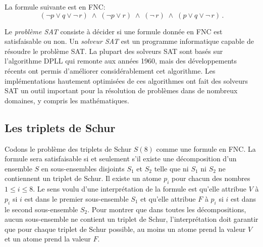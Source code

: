 La formule suivante est en FNC:
\[
(\neg p \vee q \vee \neg \,r) \;\wedge\; (\neg p \vee r)
\;\wedge\; (\neg \,r)\;\wedge\;(p \vee q \vee \neg \,r)\,.
\]

Le \emph{problème SAT} consiste à décider si une formule donnée en FNC est satisfaisable ou non. Un \emph{solveur SAT} est un programme informatique capable de résoudre le problème SAT. La plupart des solveurs SAT sont basés sur l'algorithme DPLL qui remonte aux années 1960, mais des développements récents ont permis d'améliorer considérablement cet algorithme. Les implémentations hautement optimisées de ces algorithmes ont fait des solveurs SAT un outil important pour la résolution de problèmes dans de nombreux domaines, y compris les mathématiques.

\subsection{Les triplets de Schur}

Codons le problème des triplets de Schur $S(8)$ comme une formule en FNC. La formule sera satisfaisable si et seulement s'il existe une décomposition d'un ensemble $S$ en sous-ensembles disjoints $S_1$ et $S_2$ telle que ni $S_1$ ni $S_2$ ne contiennent un triplet de Schur. Il existe un atome $p_i$ pour chacun des nombres $1\leq i \leq 8$. Le sens voulu d'une interprétation de la formule est qu'elle attribue $V$ à $p_i$ si $i$ est dans le premier sous-ensemble $S_1$ et qu'elle attribue $F$ à $p_i$ si $i$ est dans le second sous-ensemble $S_2$. Pour montrer que dans toutes les décompositions, aucun sous-ensemble ne contient un triplet de Schur, l'interprétation doit garantir que pour chaque triplet de Schur possible, au moins un atome prend la valeur $V$ et un atome prend la valeur $F$. 

